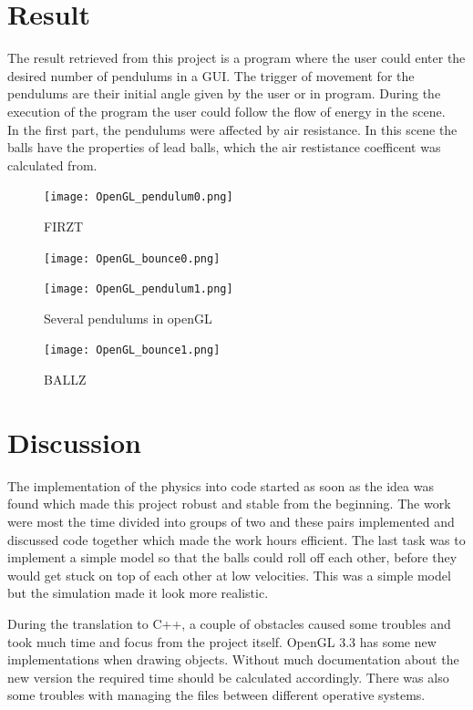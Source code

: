\documentclass[a4paper,12pt,twoside,english]{article}
\begin{document}
\section{Result}
The result retrieved from this project is a program where the user could enter the desired  number of pendulums in a GUI. The trigger of movement for the pendulums are their initial angle given by the user or in program. During the execution of the program the user could follow the flow of energy in the scene. \\

In the first part, the pendulums were affected by air resistance. In this scene the balls have the properties of lead balls, which the air restistance coefficent was calculated from. \\

\begin{figure}[h]
 \centering
 \texttt{[image: OpenGL\_pendulum0.png]}
 \caption{FIRZT}
\end{figure}


\begin{figure}[h]
 \centering
 \texttt{[image: OpenGL\_bounce0.png]}
 \caption{}
\end{figure}

\begin{figure}[h]
 \centering
 \texttt{[image: OpenGL\_pendulum1.png]}
 \caption{Several pendulums in openGL}
\end{figure}

\begin{figure}[h]
 \centering
 \texttt{[image: OpenGL\_bounce1.png]}
 \caption{BALLZ}
\end{figure}


\section{Discussion}
The implementation of the physics into code started as soon as the idea was found which made this project robust and stable from the beginning.
The work were most the time divided into groups of two and these pairs implemented and discussed code together which made the work hours efficient.
The last task was to implement a simple model so that the balls could roll off each other, before they would get stuck on top of each other at low velocities. This was a simple model but the simulation made it look more realistic.

During the translation to C++, a couple of obstacles caused some troubles and took much time and focus from the project itself. OpenGL 3.3 has some new implementations when drawing objects. Without much documentation about the new version the required time should be calculated accordingly. There was also some troubles with managing the files between different operative systems. 
\end{document}
